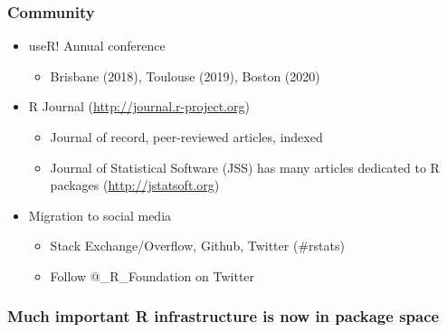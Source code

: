 \documentclass[svgnames]{beamer}
\begin{document}
\begin{frame}
  \frametitle{Community}
  \begin{itemize}
  \item useR! Annual conference
    \begin{itemize}
    \item Brisbane (2018), Toulouse (2019), Boston (2020)
    \end{itemize}
  \item R Journal (\url{http://journal.r-project.org})
    \begin{itemize}
    \item Journal of record, peer-reviewed articles, indexed
    \item Journal of Statistical Software (JSS) has many articles
      dedicated to R packages (\url{http://jstatsoft.org})
    \end{itemize}
  \item Migration to social media
    \begin{itemize}
    \item Stack Exchange/Overflow, Github, Twitter (\#rstats)
    \item Follow @\_R\_Foundation on Twitter
    \end{itemize}
  \end{itemize}
\end{frame}

\begin{frame}
  \frametitle{Much important R infrastructure is now in package space}

  \begin{center}
  \end{center}
    
\end{frame}
\end{document}
